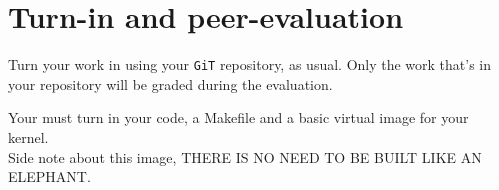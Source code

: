 \documentclass{42-en}
\begin{document}
\chapter{Turn-in and peer-evaluation}

    Turn your work in using your \texttt{GiT} repository, as
    usual. Only the work that's in your repository will be graded during
    the evaluation.

    Your must turn in your code, a Makefile and a basic virtual image for your
    kernel.\\
    Side note about this image,
    THERE IS NO NEED TO BE BUILT LIKE AN ELEPHANT.


\end{document}
